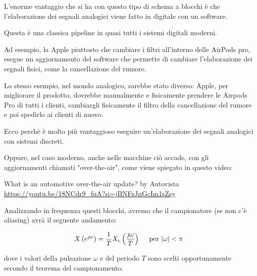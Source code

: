 \begin{tcolorbox}
    L'enorme vantaggio che si ha con questo tipo di schema a blocchi è che l'elaborazione dei segnali analogici viene fatto in digitale con un software. \newline 

    Questa è una classica pipeline in quasi tutti i sistemi digitali moderni. \newline 

    Ad esempio, la Apple piuttosto che cambiare i filtri all'interno delle AirPods pro, 
    esegue un aggiornamento del software che permette di cambiare l'elaborazione dei segnali fisici, 
    come la cancellazione del rumore. \newline 

    Lo stesso esempio, nel mondo analogico, sarebbe stato diverso: Apple, per migliorare il prodotto, dovrebbe manualmente e fisicamente prendere le Airpods Pro di tutti i clienti, cambiargli fisicamente il filtro della cancellazione del rumore e poi spedirlo ai clienti di nuovo. \newline 

    Ecco perchè è molto più vantaggioso eseguire un'elaborazione dei segnali analogici con sistemi discreti. \newline 

    Oppure, nel caso moderno, anche nelle macchine ciò accade, con gli aggiornamenti chiamati "over-the-air", come viene spiegato in questo video: \newline 

    What is an automotive over-the-air update? by Autovista \\
    \url{https://youtu.be/18NCdr9_fuA?si=jBNFzJnGcIm1sZsy}
\end{tcolorbox}

Analizzando in frequenza questi blocchi, 
avremo che il campionatore (se non c'è aliasing) avrà il seguente andamento: 

{
    \Large 
    \begin{equation}
        X \left(e^{\jmath \omega}\right) = \dfrac{1}{T} X_c \left(\dfrac{\jmath \omega}{T}\right)
        \quad
        \text{ per } \abs{\omega} < \pi
    \end{equation}

}

dove i valori della pulsazione $\omega$ e del periodo $T$ sono scelti opportunamente secondo il teorema del campionamento. \newline 

